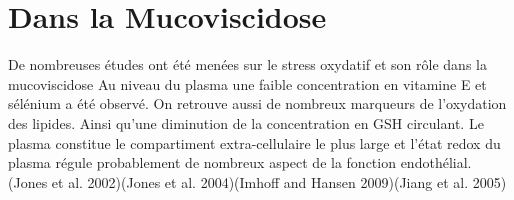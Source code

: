 
\chapter{Dans la Mucoviscidose} %


\label{ch:03-02} %



De nombreuses études ont été menées sur le stress oxydatif et son rôle dans la mucoviscidose 
Au niveau du plasma une faible concentration en vitamine E et sélénium a été observé. On retrouve aussi de nombreux marqueurs de l’oxydation des lipides. Ainsi qu’une diminution de la concentration en GSH circulant. Le plasma constitue le compartiment extra-cellulaire le plus large et l’état redox du plasma régule probablement de nombreux aspect de la fonction endothélial. \cite{jones_redox_2002}\cite{jones_cysteine/cystine_2004}\cite{imhoff_extracellular_2009}\cite{jiang_oxidant-induced_2005} (Jones et al. 2002)(Jones et al. 2004)(Imhoff and Hansen 2009)(Jiang et al. 2005)
